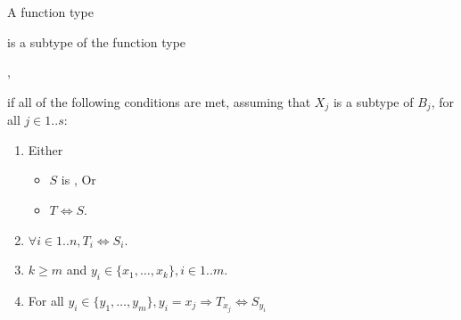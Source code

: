 \documentclass{article}
\begin{document}
\LMHash{}
A function type



\noindent
is a subtype of the function type


,

\noindent
if all of the following conditions are met,
assuming that $X_j$ is a subtype of $B_j$, for all $j \in 1 .. s$:
\begin{enumerate}
\item Either
\begin{itemize}
\item $S$ is \VOID{}, Or
\item $T \Longleftrightarrow S$.
\end{itemize}
\item $\forall i \in 1 .. n, T_i \Longleftrightarrow S_i$.
\item $k \ge m$ and $y_i \in \{x_1, \ldots, x_k\}, i \in 1 .. m$.
\item For all $y_i \in \{y_1, \ldots, y_m\}, y_i = x_j \Rightarrow T_{x_j} \Longleftrightarrow S_{y_i}$
\end{enumerate}




\end{document}
